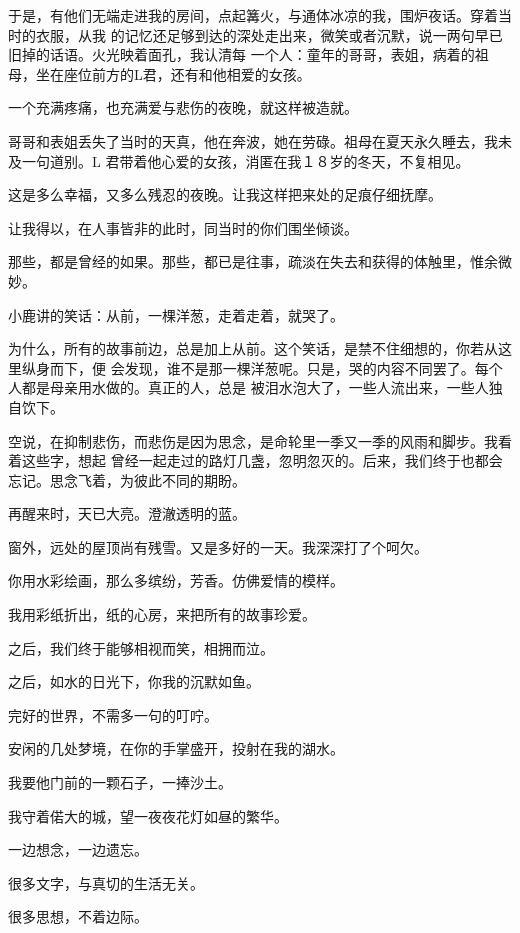 \documentclass[12pt,a4paper]{article}
\begin{document}
		于是，有他们无端走进我的房间，点起篝火，与通体冰凉的我，围炉夜话。穿着当时的衣服，从我
	的记忆还足够到达的深处走出来，微笑或者沉默，说一两句早已旧掉的话语。火光映着面孔，我认清每
	一个人：童年的哥哥，表姐，病着的祖母，坐在座位前方的L君，还有和他相爱的女孩。

		一个充满疼痛，也充满爱与悲伤的夜晚，就这样被造就。

		哥哥和表姐丢失了当时的天真，他在奔波，她在劳碌。祖母在夏天永久睡去，我未及一句道别。L
	君带着他心爱的女孩，消匿在我１８岁的冬天，不复相见。

		这是多么幸福，又多么残忍的夜晚。让我这样把来处的足痕仔细抚摩。

		让我得以，在人事皆非的此时，同当时的你们围坐倾谈。

		那些，都是曾经的如果。那些，都已是往事，疏淡在失去和获得的体触里，惟余微妙。

		小鹿讲的笑话：从前，一棵洋葱，走着走着，就哭了。

		为什么，所有的故事前边，总是加上从前。这个笑话，是禁不住细想的，你若从这里纵身而下，便
	会发现，谁不是那一棵洋葱呢。只是，哭的内容不同罢了。每个人都是母亲用水做的。真正的人，总是
	被泪水泡大了，一些人流出来，一些人独自饮下。

		空说，在抑制悲伤，而悲伤是因为思念，是命轮里一季又一季的风雨和脚步。我看着这些字，想起
	曾经一起走过的路灯几盏，忽明忽灭的。后来，我们终于也都会忘记。思念飞着，为彼此不同的期盼。

		再醒来时，天已大亮。澄澈透明的蓝。

		窗外，远处的屋顶尚有残雪。又是多好的一天。我深深打了个呵欠。

	\endwriting



		你用水彩绘画，那么多缤纷，芳香。仿佛爱情的模样。\par
		我用彩纸折出，纸的心房，来把所有的故事珍爱。

		之后，我们终于能够相视而笑，相拥而泣。\par
		之后，如水的日光下，你我的沉默如鱼。

		完好的世界，不需多一句的叮咛。\par
		安闲的几处梦境，在你的手掌盛开，投射在我的湖水。\par
		我要他门前的一颗石子，一捧沙土。\par
		我守着偌大的城，望一夜夜花灯如昼的繁华。\par
		一边想念，一边遗忘。


		很多文字，与真切的生活无关。\par
		很多思想，不着边际。
\end{document}
